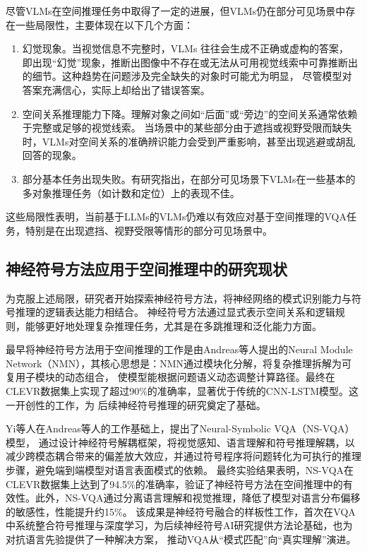 尽管VLMs在空间推理任务中取得了一定的进展，但VLMs仍在部分可见场景中存在一些局限性，主要体现在以下几个方面：
\begin{enumerate}[nosep]
\item 幻觉现象。当视觉信息不完整时，VLMs 往往会生成不正确或虚构的答案，
即出现“幻觉”现象，推断出图像中不存在或无法从可用视觉线索中可靠推断出的细节。这种趋势在问题涉及完全缺失的对象时可能尤为明显，
尽管模型对答案充满信心，实际上却给出了错误答案\cite{vardi2025clipupclipbasedunanswerableproblem}。
\item 空间关系推理能力下降。理解对象之间如“后面”或“旁边”的空间关系通常依赖于完整或足够的视觉线索。
当场景中的某些部分由于遮挡或视野受限而缺失时，VLMs对空间关系的准确辨识能力会受到严重影响，甚至出现逃避或胡乱回答的现象\cite{chen2024spatialvlmendowingvisionlanguagemodels}。
\item 部分基本任务出现失败。有研究指出，在部分可见场景下VLMs在一些基本的多对象推理任务（如计数和定位）上的表现不佳\cite{campbell2024understandinglimitsvisionlanguage}。
\end{enumerate}

这些局限性表明，当前基于LLMs的VLMs仍难以有效应对基于空间推理的VQA任务，特别是在出现遮挡、视野受限等情形的部分可见场景中。
\subsection{神经符号方法应用于空间推理中的研究现状}
为克服上述局限，研究者开始探索神经符号方法，将神经网络的模式识别能力与符号推理的逻辑表达能力相结合。
神经符号方法通过显式表示空间关系和逻辑规则，能够更好地处理复杂推理任务，尤其是在多跳推理和泛化能力方面。

最早将神经符号方法用于空间推理的工作是由Andreas等人\cite{andreas2016neural}提出的Neural Module Network（NMN），其核心思想是：NMN通过模块化分解，将复杂推理拆解为可复用子模块的动态组合，
使模型能根据问题语义动态调整计算路径。最终在CLEVR数据集上实现了超过90\%的准确率，显著优于传统的CNN-LSTM模型。这一开创性的工作，为
后续神经符号推理的研究奠定了基础。

Yi等人\cite{yi2019neuralsymbolicvqadisentanglingreasoning}在Andreas等人的工作基础上，提出了Neural-Symbolic VQA（NS-VQA）模型，
通过设计神经符号解耦框架，将视觉感知、语言理解和符号推理解耦，以减少跨模态耦合带来的偏差放大效应，并通过符号程序将问题转化为可执行的推理步骤，避免端到端模型对语言表面模式的依赖。
最终实验结果表明，NS-VQA在CLEVR数据集上达到了94.5\%的准确率，验证了神经符号方法在空间推理中的有效性。此外，NS-VQA通过分离语言理解和视觉推理，降低了模型对语言分布偏移的敏感性，性能提升约15\%。
该成果是神经符号融合的样板性工作，首次在VQA中系统整合符号推理与深度学习，为后续神经符号AI研究提供方法论基础，也为对抗语言先验提供了一种解决方案，
推动VQA从“模式匹配”向“真实理解”演进。

